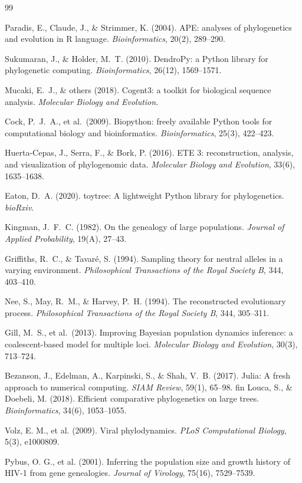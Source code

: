 \documentclass[11pt, a4paper]{article}
\begin{document}
\begin{thebibliography}{99}

Paradis, E., Claude, J., \& Strimmer, K. (2004).
APE: analyses of phylogenetics and evolution in R language.
\textit{Bioinformatics}, 20(2), 289--290.

Sukumaran, J., \& Holder, M.~T. (2010).
DendroPy: a Python library for phylogenetic computing.
\textit{Bioinformatics}, 26(12), 1569--1571.

Mucaki, E.~J., \& others (2018).
Cogent3: a toolkit for biological sequence analysis.
\textit{Molecular Biology and Evolution}.

Cock, P.~J.~A., et al.\ (2009).
Biopython: freely available Python tools for computational biology and
bioinformatics.
\textit{Bioinformatics}, 25(3), 422--423.

Huerta-Cepas, J., Serra, F., \& Bork, P. (2016).
ETE 3: reconstruction, analysis, and visualization of phylogenomic data.
\textit{Molecular Biology and Evolution}, 33(6), 1635--1638.

Eaton, D.~A. (2020).
toytree: A lightweight Python library for phylogenetics.
\textit{bioRxiv}.

Kingman, J.~F.~C. (1982).
On the genealogy of large populations.
\textit{Journal of Applied Probability}, 19(A), 27--43.

Griffiths, R.~C., \& Tavar\'{e}, S. (1994).
Sampling theory for neutral alleles in a varying environment.
\textit{Philosophical Transactions of the Royal Society B}, 344, 403--410.

Nee, S., May, R.~M., \& Harvey, P.~H. (1994).
The reconstructed evolutionary process.
\textit{Philosophical Transactions of the Royal Society B}, 344, 305--311.

Gill, M.~S., et al.\ (2013).
Improving Bayesian population dynamics inference: a coalescent-based model
for multiple loci.
\textit{Molecular Biology and Evolution}, 30(3), 713--724.

Bezanson, J., Edelman, A., Karpinski, S., \& Shah, V.~B. (2017).
Julia: A fresh approach to numerical computing.
\textit{SIAM Review}, 59(1), 65--98.
fin
Louca, S., \& Doebeli, M. (2018).
Efficient comparative phylogenetics on large trees.
\textit{Bioinformatics}, 34(6), 1053--1055.

Volz, E. M., et al. (2009).
Viral phylodynamics.
\textit{PLoS Computational Biology}, 5(3), e1000809.

Pybus, O. G., et al. (2001).
Inferring the population size and growth history of HIV-1 from gene genealogies.
\textit{Journal of Virology}, 75(16), 7529--7539.

\end{thebibliography}
\end{document}
